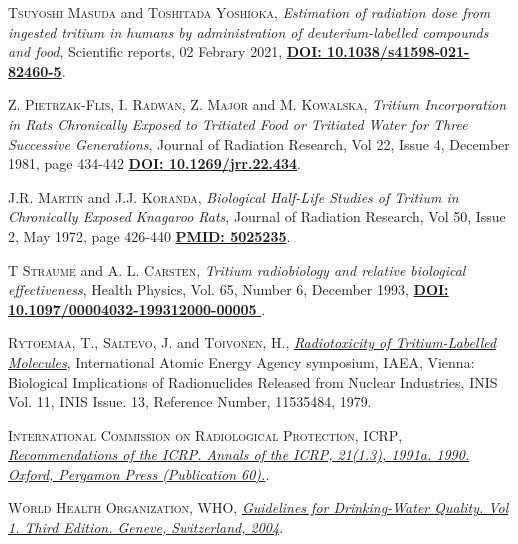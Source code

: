 \begin{thebibliography}{100}
 \textsc{Tsuyoshi Masuda} and \textsc{Toshitada Yoshioka},
\textit{Estimation of radiation dose from ingested tritium in humans by administration of deuterium-labelled compounds and food}, Scientific reports, 02 Febrary 2021, \href{https://doi.org/10.1038/s41598-021-82460-5}{\textbf{DOI: 10.1038/s41598-021-82460-5}}. 

 \textsc{Z. Pietrzak-Flis}, \textsc{I. Radwan}, \textsc{Z. Major} and \textsc{M. Kowalska},
\textit{Tritium Incorporation in Rats Chronically Exposed to Tritiated Food or Tritiated Water for Three Successive Generations}, Journal of Radiation Research, Vol 22, Issue 4, December 1981, page 434-442 \href{https://doi.org/10.1269/jrr.22.434}{\textbf{DOI: 10.1269/jrr.22.434}}. 

 \textsc{J.R. Martin} and \textsc{J.J. Koranda},
\textit{Biological Half-Life Studies of Tritium in Chronically Exposed Knagaroo Rats}, Journal of Radiation Research, Vol 50, Issue 2, May 1972, page 426-440 \href{https://www.jstor.org/stable/3573500?seq=1#metadata_info_tab_contents}{\textbf{PMID: 5025235}}. 

 \textsc{T Straume} and \textsc{A. L. Carsten},
\textit{Tritium radiobiology and relative biological effectiveness}, Health Physics, Vol. 65, Number 6, December 1993, \href{https://pubmed.ncbi.nlm.nih.gov/8244712/}{\textbf{DOI: 10.1097/00004032-199312000-00005 }}. 

 \textsc{Rytoemaa, T.}, \textsc{Saltevo, J.} and \textsc{Toivonen, H.},
\href{http://inis.iaea.org/search/search.aspx?orig_q=RN:11535484}{\textit{Radiotoxicity of Tritium-Labelled Molecules}}, International Atomic Energy Agency symposium, IAEA, Vienna: Biological Implications of Radionuclides Released from Nuclear Industries, INIS Vol. 11, INIS Issue. 13, Reference Number, 11535484, 1979. 

 \textsc{International Commission on Radiological Protection, ICRP},
\href{https://www.icrp.org/publication.asp?id=icrp\%20publication\%2060}{\textit{Recommendations of the ICRP. Annals of the ICRP, 21(1.3), 1991a. 1990. Oxford, Pergamon Press (Publication 60).}}. 

 \textsc{World Health Organization, WHO}, 
\href{http://www.who.int/water_sanitation_health/dwq/
GDWQ2004web.pdf}{\textit{Guidelines for Drinking-Water Quality. Vol 1. Third Edition. Geneve, Switzerland, 2004}}. 


\end{thebibliography}
